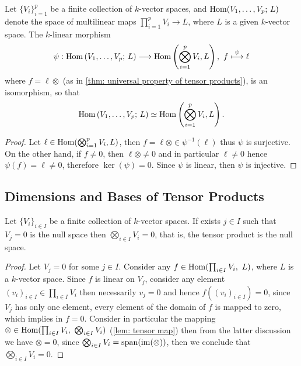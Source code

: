 \begin{corollary}
  \label{cor: multilinear maps are isomorphic to linear maps}
  Let \(\{V_i\}_{i=1}^p\) be a finite collection of \(k\)-vector spaces, and
  \(\operatorname{Hom}(V_1, \dots, V_p;\, L)\) denote the space of multilinear maps
  \(\prod_{i=1}^p V_i \to L\), where \(L\) is a given \(k\)-vector space. The
  \(k\)-linear morphism
  \[
    \psi :
    \operatorname{Hom}\left(V_1, \dots, V_p;\, L\right) \longrightarrow
    \operatorname{Hom}\left( \bigotimes_{i=1}^p V_i, L \right),\
    f \overset{\psi}\longmapsto \ell
  \]
  where \(f = \ell \otimes\) (as in \cref{thm: universal property of tensor
  products}), is an isomorphism, so that
  \[
    \operatorname{Hom}\left(V_1, \dots, V_p;\, L\right) \simeq
    \operatorname{Hom}\left( \bigotimes_{i=1}^p V_i, L \right).
  \]
\end{corollary}

\begin{proof}
  Let \(\ell \in \operatorname{Hom}(\bigotimes_{i=1}^p V_i, L)\), then \(f = \ell \otimes
  \in \psi^{-1}(\ell)\) thus \(\psi\) is surjective. On the other hand, if
  \(f \neq 0\), then \(\ell \otimes \neq 0\) and in particular \(\ell \neq 0\)
  hence \(\psi(f) = \ell \neq 0\), therefore \(\ker(\psi) = 0\). Since \(\psi\)
  is linear, then \(\psi\) is injective.
\end{proof}

\subsection{Dimensions and Bases of Tensor Products}

\begin{proposition}
  Let \(\{V_i\}_{i \in I}\) be a finite collection of \(k\)-vector spaces. If
  exists \(j \in I\) such that \(V_j = 0\) is the null space then \(\bigotimes_{i \in
  I} V_i = 0\), that is, the tensor product is the null space.
\end{proposition}

\begin{proof}
  Let \(V_j = 0\) for some \(j \in I\). Consider any \(f \in \operatorname{Hom}(\prod_{i
  \in I} V_i,\ L)\), where \(L\) is a \(k\)-vector space. Since \(f\) is linear
  on \(V_j\), consider any element \((v_i)_{i \in I} \in \prod_{i \in I} V_i\)
  then necessarily \(v_j = 0\) and hence \(f((v_i)_{i \in I}) = 0\), since
  \(V_j\) has only one element, every element of the domain of \(f\) is mapped
  to zero, which implies in \(f = 0\). Consider in particular the mapping \(\otimes
  \in \operatorname{Hom}(\prod_{i \in I} V_i ,\ \bigotimes_{i \in I} V_i)\) (\cref{lem: tensor
  map}) then from the latter discussion we have \(\otimes = 0\), since \(\bigotimes_{i
  \in I} V_i = \operatorname{span}(\operatorname{im}(\otimes))\), then we conclude that \(\bigotimes_{i
  \in I} V_i = 0\).
\end{proof}

